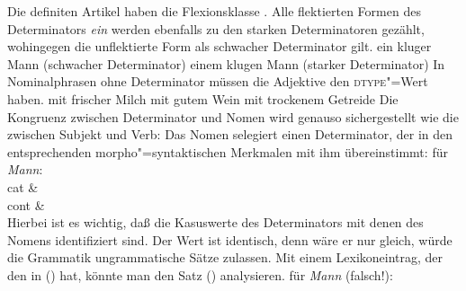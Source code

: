 Die definiten Artikel haben die Flexionsklasse . Alle flektierten Formen
des Determinators \emph{ein} werden ebenfalls zu den starken Determinatoren gezählt,
wohingegen die unflektierte Form als schwacher Determinator gilt.
\eal
\ex ein kluger Mann   (schwacher Determinator)
\ex einem klugen Mann (starker Determinator)
\zl
In Nominalphrasen ohne Determinator müssen die Adjektive den \textsc{dtype}"=Wert  haben.
\eal
\ex mit frischer Milch
\ex mit gutem Wein
\ex mit trockenem Getreide
\zl
Die Kongruenz zwischen Determinator und Nomen wird genauso sichergestellt wie die zwischen Subjekt und Verb:
Das Nomen selegiert einen Determinator, der in den entsprechenden morpho"=syntaktischen Merkmalen
mit ihm übereinstimmt:
\ea
\label{le-mann}
\localw für \emph{Mann}:\\
\ms
{ cat &  \\
  cont &  \\
}
\z
Hierbei ist es wichtig, daß die Kasuswerte des Determinators mit denen des Nomens
identifiziert sind. Der Wert ist identisch, denn wäre er nur gleich, würde die Grammatik
ungrammatische Sätze zulassen. Mit einem Lexikoneintrag, der den \catw in () hat,
könnte man den Satz () analysieren.
\ea
\catw für \emph{Mann} (falsch!):\\
